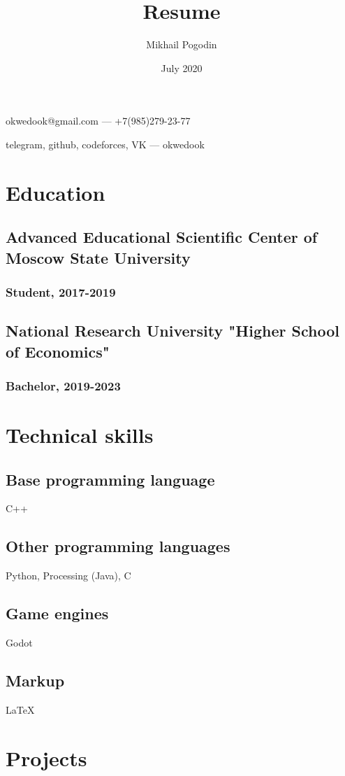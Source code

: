 \documentclass[12pt]{article}
\title{Resume}
\author{Mikhail Pogodin}
\date{July 2020}
\makeatletter
\renewcommand{\maketitle}{
    \begin{center}
        { \Huge
        \bfseries
        \theauthor }
        
        \vspace{0.5em}
        \large
        okwedook@gmail.com --- +7(985)279-23-77
        
        telegram, github, codeforces, VK --- okwedook
    \end{center}
}
\makeatother
\begin{document}
\maketitle

\section{Education}

\subsection{Advanced Educational Scientific Center of Moscow State University}
\subsubsection{Student, 2017-2019}

\subsection{National Research University "Higher School of Economics"}
\subsubsection{Bachelor, 2019-2023}

\section{Technical skills}

\subsection{Base programming language} C++

\subsection{Other programming languages} Python, Processing (Java), C

\subsection{Game engines} Godot

\subsection{Markup} \LaTeX

\section{Projects}
\end{document}
